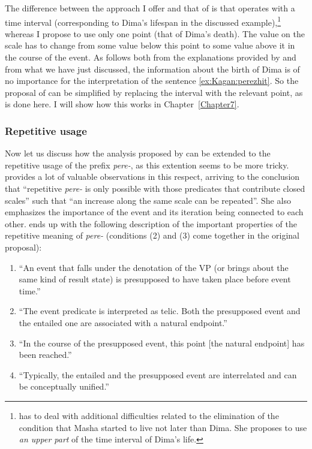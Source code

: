The difference between the approach I offer and that of \citet{Kagan:book} is that \citet{Kagan:book} operates with a time interval (corresponding to Dima's lifespan in the discussed example),\footnote{\citet[143-144]{Kagan:book} has to deal with additional difficulties related to the elimination of the condition that Masha started to live not later than Dima. She proposes to use \textit{an upper part} of the time interval of Dima's life.} whereas I propose to use only one point (that of Dima's death). The value on the scale has to change from some value below this point to some value above it in the course of the event. As follows both from the explanations provided by \citet{Kagan:book} and from what we have just discussed, the information about the birth of Dima is of no importance for the interpretation of the sentence \ref{ex:Kagan:perezhit}. So the proposal of \citet{Kagan:book} can be simplified by replacing the interval with the relevant point, as is done here. I will show how this works in Chapter~\ref{Chapter7}.

\subsubsection{Repetitive usage}
Now let us discuss how the analysis proposed by \citet{Kagan:book} can be extended to the repetitive usage of the prefix \textit{pere-}, as this extention seems to be more tricky. \citet[149]{Kagan:book} provides a lot of valuable observations in this respect, arriving to the conclusion that ``repetitive \textit{pere-} is only possible with those predicates that contribute closed scales''
such that ``an increase along the same scale can be repeated''. She also emphasizes the importance of the event and its iteration being connected to each other. \citet[148]{Kagan:book} ends up with the following description of the important properties of the repetitive meaning of \textit{pere-} (conditions (2) and (3) come together in the original proposal): 
\begin{enumerate}
\item ``An event that falls under the denotation of the VP (or brings about the same kind of result state) is presupposed to have taken place before event time.'' 
\item ``The event predicate is interpreted as telic. Both the presupposed event and the entailed one are associated with a natural endpoint.'' 
\item ``In the course of the presupposed event, this point [the natural endpoint] has been reached.''
\item ``Typically, the entailed and the presupposed event are interrelated and can be conceptually unified.''
\end{enumerate}

